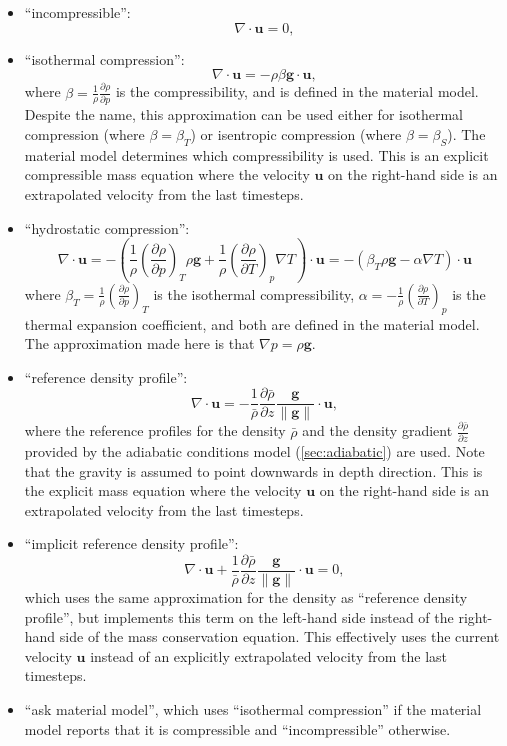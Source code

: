 \documentclass{article}
\begin{document}
\begin{itemize}

\item
``incompressible'':
\[
 \nabla \cdot \textbf{u} = 0,
\]

\item
``isothermal compression'':
\[
 \nabla \cdot \textbf{u} = -\rho \beta \textbf{g} \cdot \textbf{u},
\]
where $\beta = \frac{1}{\rho} \frac{\partial \rho}{\partial p}$ is the compressibility, and 
is defined in the material model. Despite the name, this approximation can be used either for
isothermal compression (where $\beta = \beta_T$) or isentropic compression
(where $\beta = \beta_S$). The material model determines which compressibility is used.
This is an explicit compressible mass equation where 
the velocity $\textbf{u}$ on the right-hand side is an extrapolated velocity
from the last timesteps.

\item
``hydrostatic compression'':
\[
 \nabla \cdot \textbf{u}
= - \left( \frac{1}{\rho} \left( \frac{\partial \rho}{\partial p} \right)_{T} \rho \textbf{g} + \frac{1}{\rho} \left( \frac{\partial \rho}{\partial T} \right)_{p} \nabla T \right) \cdot \textbf{u}
= - \left( \beta_T \rho \textbf{g} - \alpha \nabla T \right) \cdot \textbf{u}
\]
where $\beta_T = \frac{1}{\rho} \left(\frac{\partial \rho}{\partial p} \right)_{T}$ is the isothermal compressibility,
$\alpha = - \frac{1}{\rho} \left(\frac{\partial \rho}{\partial T} \right)_{p}$ is the
thermal expansion coefficient, and both are defined in the material model. The
approximation made here is that $\nabla p = \rho \textbf{g}$.

\item
``reference density profile'':
\[
 \nabla \cdot \textbf{u} = -\frac{1}{\bar{\rho}} \frac{\partial \bar{\rho}}{\partial z} \frac{\textbf{g}}{\|\textbf{g}\|} \cdot \textbf{u},
\]
where the reference profiles for the density $\bar{\rho}$ and the density gradient $\frac{\partial \bar{\rho}}{\partial z}$
provided by the adiabatic conditions model (\ref{sec:adiabatic})
are used. Note that the gravity is assumed to point downwards in depth direction.
This is the explicit mass equation where the velocity $\textbf{u}$ on the right-hand 
side is an extrapolated velocity from the last timesteps.

\item
``implicit reference density profile'':
\[
 \nabla \cdot \textbf{u} + \frac{1}{\bar{\rho}} \frac{\partial \bar{\rho}}{\partial z} \frac{\textbf{g}}{\|\textbf{g}\|} \cdot \textbf{u} = 0,
\]
which uses the same approximation for the density as ``reference density profile'', 
but implements this term on the left-hand side instead of the right-hand side of the mass
conservation equation. This effectively uses the current velocity $\textbf{u}$ instead
of an explicitly extrapolated velocity from the last timesteps.

 \item 
``ask material model'', which uses ``isothermal compression'' if the material model reports 
that it is compressible and ``incompressible'' otherwise.
\end{itemize}
\end{document}
